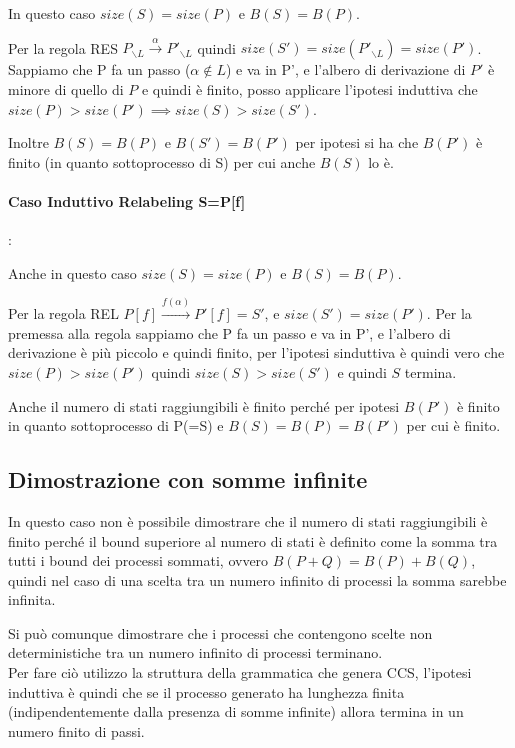 \documentclass{article}
\newcommand{\pl}{P_{\backslash L}}
\newcommand{\pil}{P'_{\backslash L}}
\newcommand{\passo}{\xrightarrow{\alpha}}
\newcommand{\passof}{\xrightarrow{f(\alpha)}}
\begin{document}
In questo caso $size(S) = size(P)$ e $B(S)=B(P)$. 

Per la regola RES $\pl \passo \pil$ quindi $size(S')= size(\pil) =size(P')$. Sappiamo che P fa un passo ($\alpha \not\in L$) e va in P', e l'albero di derivazione di $P'$ è minore di quello di $P$ e quindi è finito, posso applicare l'ipotesi induttiva che $size(P)>size(P') \implies size(S)>size(S')$. 

Inoltre $B(S) =B(P)$ e $B(S') =B(P')$ per ipotesi si ha che $B(P')$ è finito (in quanto sottoprocesso di S) per cui anche $B(S)$ lo è.

\paragraph{Caso Induttivo Relabeling S=P[f]}:


Anche in questo caso $ size(S) = size(P) $ e $ B(S)=B(P) $. 

Per la regola REL $P[f] \passof P'[f] =S'$, e $size(S') = size(P') $. Per la premessa alla regola sappiamo che P fa un passo e va in P', e l'albero di derivazione è più piccolo e quindi finito, per l'ipotesi sinduttiva è quindi vero che $size(P)>size(P')$  quindi $size(S)>size(S')$ e quindi $S$ termina.

Anche il numero di stati raggiungibili è finito perché per ipotesi $B(P')$ è finito in quanto sottoprocesso di P(=S) e $B(S)=B(P)=B(P')$ per cui è finito.



\subsection{Dimostrazione con somme infinite}

In questo caso non è possibile dimostrare che il numero di stati raggiungibili è finito perché il bound superiore al numero di stati è definito come la somma tra tutti i bound dei processi sommati, ovvero $B(P+Q)=B(P)+B(Q)$, quindi nel caso di una scelta tra un numero infinito di processi la somma sarebbe infinita.

Si può comunque dimostrare che i processi che contengono scelte non deterministiche tra un numero infinito di processi terminano.\\

Per fare ciò utilizzo la struttura della grammatica che genera CCS,
l'ipotesi induttiva è quindi che se il processo generato ha lunghezza finita (indipendentemente dalla presenza di somme infinite) allora termina in un numero finito di passi.
\end{document}
